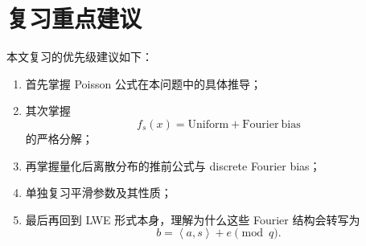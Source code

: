 \documentclass[12pt,a4paper]{ctexart}
\newcommand{\ip}[2]{\left\langle #1,#2\right\rangle}
\begin{document}
\section{复习重点建议}

本文复习的优先级建议如下：

\begin{enumerate}[label=\arabic*.]
    \item 首先掌握 Poisson 公式在本问题中的具体推导；
    \item 其次掌握
    \[
    f_s(x)=\mathrm{Uniform}+\mathrm{Fourier\ bias}
    \]
    的严格分解；
    \item 再掌握量化后离散分布的推前公式与 discrete Fourier bias；
    \item 单独复习平滑参数及其性质；
    \item 最后再回到 LWE 形式本身，理解为什么这些 Fourier 结构会转写为
    \[
    b=\ip{a}{s}+e \pmod q.
    \]
\end{enumerate}
\end{document}

